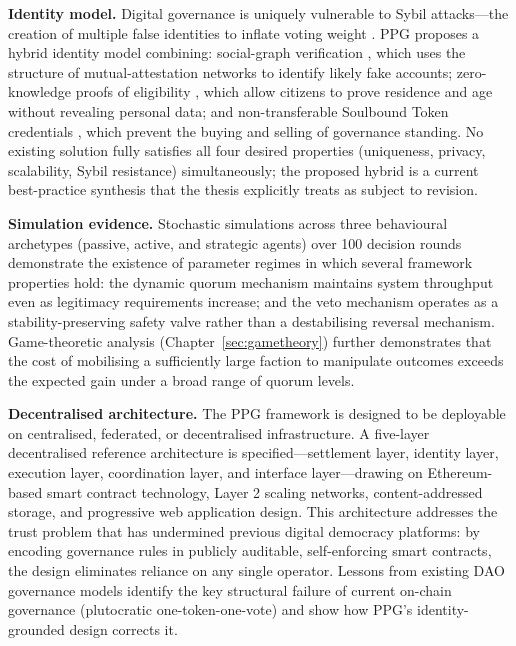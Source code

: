 \documentclass[12pt,a4paper,oneside]{report}
\begin{document}
\vspace{0.7em}
\noindent\textbf{Identity model.}
Digital governance is uniquely vulnerable to Sybil attacks---the creation of multiple false identities to inflate voting weight \citep{douceur2002sybil}. PPG proposes a hybrid identity model combining: social-graph verification \citep{pentland2014social}, which uses the structure of mutual-attestation networks to identify likely fake accounts; zero-knowledge proofs of eligibility \citep{boneh2020graduate}, which allow citizens to prove residence and age without revealing personal data; and non-transferable Soulbound Token credentials \citep{buterin2022desoc}, which prevent the buying and selling of governance standing. No existing solution fully satisfies all four desired properties (uniqueness, privacy, scalability, Sybil resistance) simultaneously; the proposed hybrid is a current best-practice synthesis that the thesis explicitly treats as subject to revision.

\vspace{0.7em}
\noindent\textbf{Simulation evidence.}
Stochastic simulations across three behavioural archetypes (passive, active, and strategic agents) over 100 decision rounds demonstrate the existence of parameter regimes in which several framework properties hold: the dynamic quorum mechanism maintains system throughput even as legitimacy requirements increase; and the veto mechanism operates as a stability-preserving safety valve rather than a destabilising reversal mechanism. Game-theoretic analysis (Chapter~\ref{sec:gametheory}) further demonstrates that the cost of mobilising a sufficiently large faction to manipulate outcomes exceeds the expected gain under a broad range of quorum levels.

\vspace{0.7em}
\noindent\textbf{Decentralised architecture.}
The PPG framework is designed to be deployable on centralised, federated, or decentralised infrastructure. A five-layer decentralised reference architecture is specified---settlement layer, identity layer, execution layer, coordination layer, and interface layer---drawing on Ethereum-based smart contract technology, Layer 2 scaling networks, content-addressed storage, and progressive web application design. This architecture addresses the trust problem that has undermined previous digital democracy platforms: by encoding governance rules in publicly auditable, self-enforcing smart contracts, the design eliminates reliance on any single operator. Lessons from existing DAO governance models identify the key structural failure of current on-chain governance (plutocratic one-token-one-vote) and show how PPG's identity-grounded design corrects it.
\end{document}
